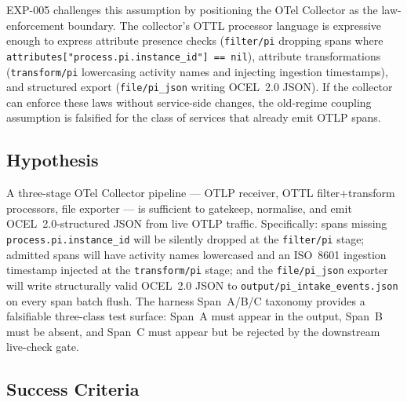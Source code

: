 EXP-005 challenges this assumption by positioning the OTel Collector as the law-enforcement
boundary. The collector's OTTL processor language is expressive enough to express attribute
presence checks (\texttt{filter/pi} dropping spans where
\texttt{attributes["process.pi.instance\_id"] == nil}), attribute transformations
(\texttt{transform/pi} lowercasing activity names and injecting ingestion timestamps), and
structured export (\texttt{file/pi\_json} writing OCEL~2.0 JSON). If the collector can
enforce these laws without service-side changes, the old-regime coupling assumption is
falsified for the class of services that already emit OTLP spans.

\subsection{Hypothesis}
\label{sec:otel-weaver-exp-005-collector-to-intake-rq-hypothesis}

A three-stage OTel Collector pipeline --- OTLP receiver, OTTL filter+transform processors,
file exporter --- is sufficient to gatekeep, normalise, and emit OCEL~2.0-structured JSON
from live OTLP traffic. Specifically: spans missing \texttt{process.pi.instance\_id} will be
silently dropped at the \texttt{filter/pi} stage; admitted spans will have activity names
lowercased and an ISO~8601 ingestion timestamp injected at the \texttt{transform/pi} stage;
and the \texttt{file/pi\_json} exporter will write structurally valid OCEL~2.0 JSON to
\texttt{output/pi\_intake\_events.json} on every span batch flush. The harness Span~A/B/C
taxonomy provides a falsifiable three-class test surface: Span~A must appear in the output,
Span~B must be absent, and Span~C must appear but be rejected by the downstream live-check
gate.

\subsection{Success Criteria}
\label{sec:otel-weaver-exp-005-collector-to-intake-rq-success}

